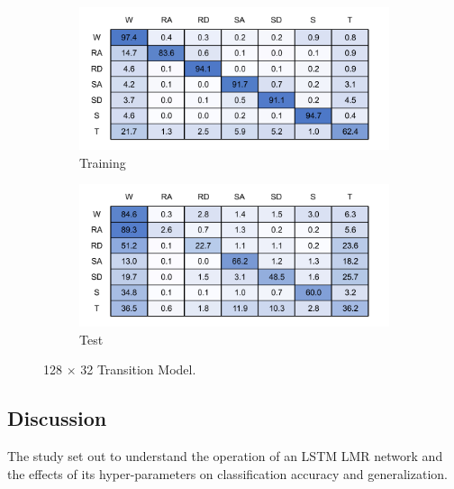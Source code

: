 \begin{figure}[!hbt]
    \centering
    \begin{subfigure}{.45\textwidth}
        \centering
        \includegraphics[width=\textwidth]{content/4-LSTM_Behaviour/results/conf_matricies/Training_128x32_T.pdf}
        \caption{Training}
        \label{fig:tran_model_conf_matrix_training_128x32}
    \end{subfigure}
    \begin{subfigure}{.45\textwidth}
        \centering
        \includegraphics[width=\textwidth]{content/4-LSTM_Behaviour/results/conf_matricies/Test_128x32_T.pdf}
	  \caption{Test}
        \label{fig:tran_model_conf_matrix_test_128x32}
    \end{subfigure}
    \caption{128 $\times$ 32 Transition Model.}
    \label{fig:128x32_transition_confusion_matrix}
\end{figure}

\subsection{Discussion}
\label{sec:discussion}
The study set out to understand the operation of an LSTM LMR network and the effects of its hyper-parameters on classification accuracy and generalization.

